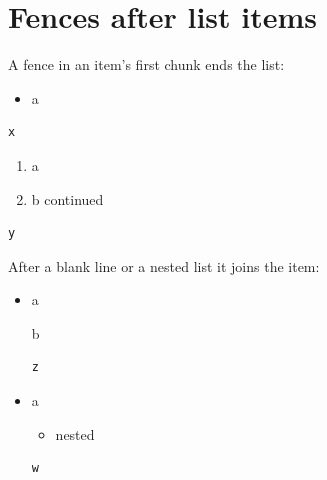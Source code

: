 \section{Fences after list items}\label{fences-after-list-items}

A fence in an item's first chunk ends the list:

\begin{itemize}
\tightlist
\item
  a
\end{itemize}

\begin{verbatim}
x
\end{verbatim}

\begin{enumerate}
\def\labelenumi{\arabic{enumi}.}
\tightlist
\item
  a
\item
  b continued
\end{enumerate}

\begin{verbatim}
y
\end{verbatim}

After a blank line or a nested list it joins the item:

\begin{itemize}
\item
  a

  b

\begin{verbatim}
z
\end{verbatim}
\item
  a

  \begin{itemize}
  \tightlist
  \item
    nested
  \end{itemize}

\begin{verbatim}
w
\end{verbatim}
\end{itemize}
